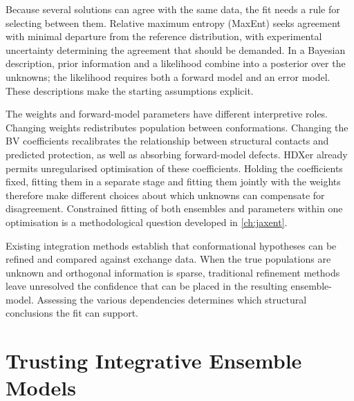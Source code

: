 Because several solutions can agree with the same data, the fit needs a rule for selecting between them. Relative maximum entropy (MaxEnt) seeks agreement with minimal departure from the reference distribution, with experimental uncertainty determining the agreement that should be demanded.\supercite{cesariUsingMaximumEntropy2018} In a Bayesian description, prior information and a likelihood combine into a posterior over the unknowns; the likelihood requires both a forward model and an error model.\supercite{bmsb2012ch12} These descriptions make the starting assumptions explicit.

The weights and forward-model parameters have different interpretive roles. Changing weights redistributes population between conformations. Changing the BV coefficients recalibrates the relationship between structural contacts and predicted protection, as well as absorbing forward-model defects. HDXer already permits unregularised optimisation of these coefficients.\supercite{bradshawInterpretationHDXData2020} Holding the coefficients fixed, fitting them in a separate stage and fitting them jointly with the weights therefore make different choices about which unknowns can compensate for disagreement. Constrained fitting of both ensembles and parameters within one optimisation is a methodological question developed in \cref{ch:jaxent}.

Existing integration methods establish that conformational hypotheses can be refined and compared against exchange data. When the true populations are unknown and orthogonal information is sparse, traditional refinement methods leave unresolved the confidence that can be placed in the resulting ensemble-model. Assessing the various dependencies determines which structural conclusions the fit can support.

\section{Trusting Integrative Ensemble Models}
\label{sec:intro-trust}

